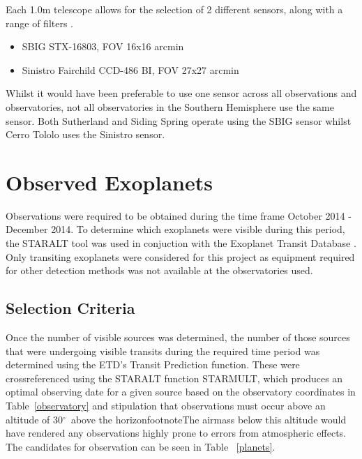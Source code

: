 \documentclass{report}
\begin{document}
Each 1.0m telescope allows for the selection of 2 different sensors, along with a range of filters \parencite{1m}.

\begin{itemize}

  \item SBIG STX-16803, FOV 16x16 arcmin
  \item Sinistro Fairchild CCD-486 BI, FOV 27x27 arcmin

\end{itemize} 

Whilst it would have been preferable to use one sensor across all observations and observatories, not all observatories in the Southern Hemisphere use the same sensor. Both Sutherland and Siding Spring operate using the SBIG sensor whilst Cerro Tololo uses the Sinistro sensor.    


\section{Observed Exoplanets}
Observations were required to be obtained during the time frame October 2014 - December 2014. To determine which exoplanets were visible during this period, the STARALT tool \parencite{staralt} was used in conjuction with the Exoplanet Transit Database \parencite{etd}. Only transiting exoplanets were considered for this project as equipment required for other detection methods was not available at the observatories used. 

\subsection{Selection Criteria}
Once the number of visible sources was determined, the number of those sources that were undergoing visible transits during the required time period was determined using the ETD's Transit Prediction function. These were crossreferenced using the STARALT function STARMULT, which produces an optimal observing date for a given source based on the observatory coordinates in Table~\ref{observatory} and stipulation that observations must occur above an altitude of 30$^\circ$\ above the horizonfootnote{The airmass below this altitude would have rendered any observations highly prone to errors from atmospheric effects}. The candidates for observation can be seen in Table ~\ref{planets}.
\end{document}

